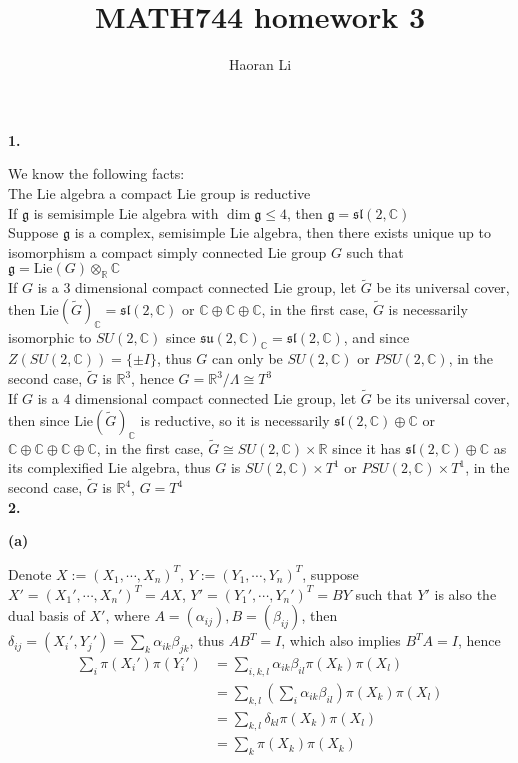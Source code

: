 \documentclass[10pt]{article}
\title{MATH744 homework 3}
\author{Haoran Li}
\date{}
\newcommand{\<}[1]{\langle #1 \rangle}
\begin{document}
\maketitle

\textbf{1.} \par
We know the following facts: \\
The Lie algebra a compact Lie group is reductive \\
If $\mathfrak{g}$ is semisimple Lie algebra with $\dim\mathfrak{g}\leq4$, then $\mathfrak{g}=\mathfrak{sl}(2,\mathbb C)$ \\
Suppose $\mathfrak{g}$ is a complex, semisimple Lie algebra, then there exists unique up to isomorphism a compact simply connected Lie group $G$ such that $\mathfrak{g}=\displaystyle\mathrm{Lie}(G)\otimes_\mathbb R\mathbb C$ \\
If $G$ is a $3$ dimensional compact connected Lie group, let $\tilde{G}$ be its universal cover, then $\mathrm{Lie}(\tilde G)_{\mathbb C}=\mathfrak{sl}(2,\mathbb C)$ or $\mathbb C\oplus\mathbb C\oplus\mathbb C$, in the first case, $\tilde G$ is necessarily isomorphic to $SU(2,\mathbb C)$ since $\mathfrak{su}(2,\mathbb C)_\mathbb C=\mathfrak{sl}(2,\mathbb C)$, and since $Z(SU(2,\mathbb C))=\{\pm I\}$, thus $G$ can only be $SU(2,\mathbb C)$ or $PSU(2,\mathbb C)$, in the second case, $\tilde G$ is $\mathbb R^3$, hence $G=\mathbb R^3/\Lambda\cong T^3$ \\
If $G$ is a $4$ dimensional compact connected Lie group, let $\tilde{G}$ be its universal cover, then since $\mathrm{Lie}(\tilde G)_{\mathbb C}$ is reductive, so it is necessarily $\mathfrak{sl}(2,\mathbb C)\oplus\mathbb C$ or $\mathbb C\oplus\mathbb C\oplus\mathbb C\oplus\mathbb C$, in the first case, $\tilde G\cong SU(2,\mathbb C)\times\mathbb R$ since it has $\mathfrak{sl}(2,\mathbb C)\oplus\mathbb C$ as its complexified Lie algebra, thus $G$ is $SU(2,\mathbb C)\times T^1$ or $PSU(2,\mathbb C)\times T^1$, in the second case, $\tilde G$ is $\mathbb R^4$, $G=T^4$ \\
\textbf{2.} \par
\textbf{(a)} \par
Denote $X:=(X_1,\cdots,X_n)^T$, $Y:=(Y_1,\cdots,Y_n)^T$, suppose $X'=(X_1',\cdots,X_n')^T=AX$, $Y'=(Y_1',\cdots,Y_n')^T=BY$ such that $Y'$ is also the dual basis of $X'$, where $A=(\alpha_{ij}),B=(\beta_{ij})$, then $\delta_{ij}=(X_i',Y_j')=\displaystyle\sum_{k}\alpha_{ik}\beta_{jk}$, thus $AB^T=I$, which also implies $B^TA=I$, hence 
\begin{align*}
\displaystyle\sum_{i}\pi(X_i')\pi(Y_i')&=\sum_{i,k,l}\alpha_{ik}\beta_{il}\pi(X_k)\pi(X_l) \\
&=\sum_{k,l}\left(\sum_{i}\alpha_{ik}\beta_{il}\right)\pi(X_k)\pi(X_l) \\
&=\sum_{k,l}\delta_{kl}\pi(X_k)\pi(X_l) \\
&=\sum_{k}\pi(X_k)\pi(X_k)
\end{align*}
\end{document}
